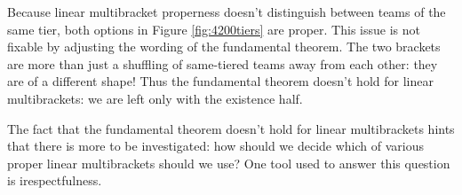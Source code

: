 {

Because linear multibracket properness doesn't distinguish between teams of the same tier, both options in Figure \ref{fig:4200tiers} are proper. This issue is not fixable by adjusting the wording of the fundamental theorem. The two brackets are more than just a shuffling of same-tiered teams away from each other: they are of a different shape! Thus the fundamental theorem doesn't hold for linear multibrackets: we are left only with the existence half.


    The fact that the fundamental theorem doesn't hold for linear multibrackets hints that there is more to be investigated: how should we decide which of various proper linear multibrackets should we use? One tool used to answer this question is i{respectfulness}.
}